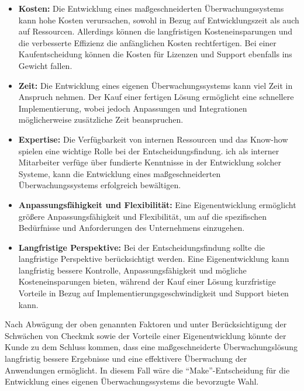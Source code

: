 \begin{flushleft}
	\begin{itemize}
	\item \textbf{Kosten:} Die Entwicklung eines maßgeschneiderten Überwachungssystems kann hohe Kosten verursachen, sowohl in Bezug auf Entwicklungszeit als auch auf Ressourcen. Allerdings können die langfristigen Kosteneinsparungen und die verbesserte Effizienz die anfänglichen Kosten rechtfertigen. Bei einer Kaufentscheidung können die Kosten für Lizenzen und Support ebenfalls ins Gewicht fallen.

	\item \textbf{Zeit:} Die Entwicklung eines eigenen Überwachungssystems kann viel Zeit in Anspruch nehmen. Der Kauf einer fertigen Lösung ermöglicht eine schnellere Implementierung, wobei jedoch Anpassungen und Integrationen möglicherweise zusätzliche Zeit beanspruchen.

	\item \textbf{Expertise:} Die Verfügbarkeit von internen Ressourcen und das Know-how spielen eine wichtige Rolle bei der Entscheidungsfindung. ich als interner Mitarbeiter verfüge über fundierte Kenntnisse in der Entwicklung solcher Systeme, kann die Entwicklung eines maßgeschneiderten Überwachungssystems erfolgreich bewältigen.

	\item \textbf{Anpassungsfähigkeit und Flexibilität:} Eine Eigenentwicklung ermöglicht größere Anpassungsfähigkeit und Flexibilität, um auf die spezifischen Bedürfnisse und Anforderungen des Unternehmens einzugehen.

	\item \textbf{Langfristige Perspektive:} Bei der Entscheidungsfindung sollte die langfristige Perspektive berücksichtigt werden. Eine Eigenentwicklung kann langfristig bessere Kontrolle, Anpassungsfähigkeit und mögliche Kosteneinsparungen bieten, während der Kauf einer Lösung kurzfristige Vorteile in Bezug auf Implementierungsgeschwindigkeit und Support bieten kann.


	\end{itemize}

	Nach Abwägung der oben genannten Faktoren und unter Berücksichtigung der Schwächen von Checkmk sowie der Vorteile einer Eigenentwicklung könnte der Kunde zu dem Schluss kommen, dass eine maßgeschneiderte Überwachungslösung langfristig bessere Ergebnisse und eine effektivere Überwachung der Anwendungen ermöglicht. In diesem Fall wäre die “Make”-Entscheidung für die Entwicklung eines eigenen Überwachungssystems die bevorzugte Wahl.


\end{flushleft}
